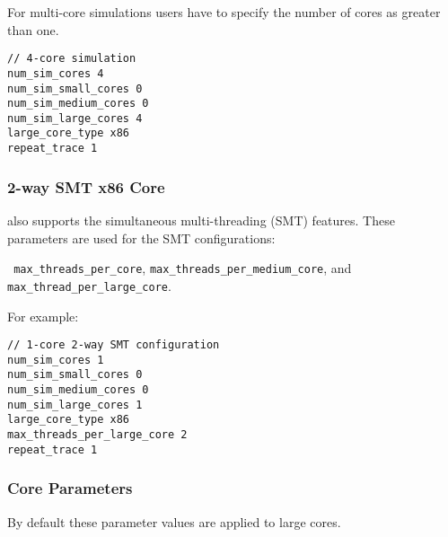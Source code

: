 For multi-core simulations users have to specify the number of cores as greater than one.


\begin{Verbatim}
// 4-core simulation
num_sim_cores 4
num_sim_small_cores 0
num_sim_medium_cores 0
num_sim_large_cores 4
large_core_type x86
repeat_trace 1
\end{Verbatim}


\subsubsection{2-way SMT x86 Core}

\SIM also supports the simultaneous multi-threading (SMT) features.
These parameters are used for the SMT configurations:

\Verb+ max_threads_per_core+, \Verb+max_threads_per_medium_core+, and 
\Verb+max_thread_per_large_core+. 

\noindent For example:
\begin{Verbatim}
// 1-core 2-way SMT configuration
num_sim_cores 1
num_sim_small_cores 0
num_sim_medium_cores 0
num_sim_large_cores 1
large_core_type x86
max_threads_per_large_core 2
repeat_trace 1
\end{Verbatim}



\subsubsection{\cpu Core Parameters}

By default these parameter values are applied to large cores. 


